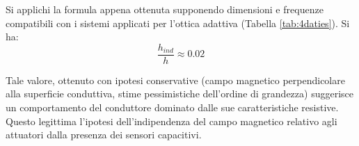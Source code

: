 Si applichi la formula appena ottenuta supponendo dimensioni e frequenze compatibili con i sistemi applicati per l'ottica adattiva (Tabella \ref{tab:4daties}). Si ha:
\begin{equation}
\label{eq:4es7}
\frac{h_{ind}}{h}\approx 0.02
\end{equation}

Tale valore, ottenuto con ipotesi conservative (campo magnetico perpendicolare alla superficie conduttiva, stime pessimistiche dell'ordine di grandezza) suggerisce un comportamento del conduttore dominato dalle sue caratteristiche resistive. Questo legittima l'ipotesi dell'indipendenza del campo magnetico relativo agli attuatori dalla presenza dei sensori capacitivi. 

